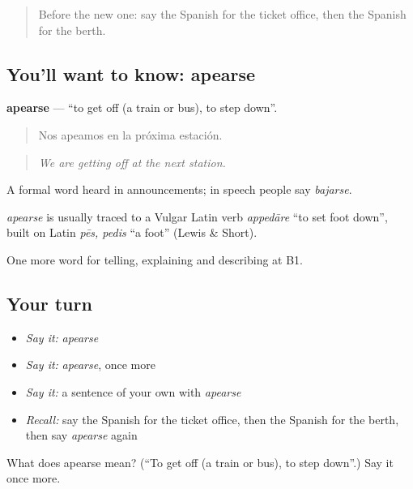 \label{lesson:ES-C651-apearse}



\begin{quote}
Before the new one: say the Spanish for the ticket office, then the Spanish for the berth.
\end{quote}

\subsection*{You'll want to know: apearse}
\textbf{apearse} — \textquotedblleft{}to get off (a train or bus), to step down\textquotedblright{}.

\begin{quote}
Nos apeamos en la próxima estación.
\end{quote}

\begin{quote}
\emph{We are getting off at the next station.}
\end{quote}

A formal word heard in announcements; in speech people say \emph{bajarse}.

\begin{cousinweb}
\emph{apearse} is usually traced to a Vulgar Latin verb \emph{appedāre} \textquotedblleft{}to set foot down\textquotedblright{}, built on Latin \emph{pēs, pedis} \textquotedblleft{}a foot\textquotedblright{} (Lewis \& Short).
\end{cousinweb}

\begin{grammarlens}[title={What you've built}]
One more word for telling, explaining and describing at B1.
\end{grammarlens}

\subsection*{Your turn}
\begin{itemize}
\raggedright
  \item \emph{Say it:} \emph{apearse}
  \item \emph{Say it:} \emph{apearse}, once more
  \item \emph{Say it:} a sentence of your own with \emph{apearse}
  \item \emph{Recall:} say the Spanish for the ticket office, then the Spanish for the berth, then say \emph{apearse} again
\end{itemize}

\begin{tcolorbox}[breakable,colback=teal!4,colframe=teal!35!black,title={Before you move on}]
What does apearse mean? (\textquotedblleft{}To get off (a train or bus), to step down\textquotedblright{}.) Say it once more.
\end{tcolorbox}
